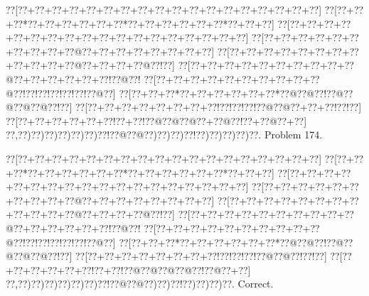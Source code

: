 \documentclass[a5paper]{article}
\begin{document}
\begin{center}
{\goo
\0??[\0??+\0??+\0??+\0??+\0??+\0??+\0??+\0??+\0??+\0??+\0??+\0??+\0??+\0??+\0??+\0??+\0??+\0??]
\0??[\0??+\0??+\0??*\0??+\0??+\0??+\0??+\0??+\0??*\0??+\0??+\0??+\0??+\0??+\0??*\0??+\0??+\0??]
\0??[\0??+\0??+\0??+\0??+\0??+\0??+\0??+\0??+\0??+\0??+\0??+\0??+\0??+\0??+\0??+\0??+\0??+\0??]
\0??[\0??+\0??+\0??+\0??+\0??+\0??+\0??+\0??+\0??+\0??@\0??+\0??+\0??+\0??+\0??+\0??+\0??+\0??]
\0??[\0??+\0??+\0??+\0??+\0??+\0??+\0??+\0??+\0??+\0??+\0??+\0??@\0??+\0??+\0??+\0??@\0??!\0??]
\0??[\0??+\0??+\0??+\0??+\0??+\0??+\0??+\0??+\0??+\0??@\0??+\0??+\0??+\0??+\0??+\0??!\0??@\0??!
\0??[\0??+\0??+\0??+\0??+\0??+\0??+\0??+\0??+\0??+\0??@\0??!\0??!\0??!\0??!\0??!\0??!\0??@\0??]
\0??[\0??+\0??+\0??*\0??+\0??+\0??+\0??+\0??+\0??*\0??@\0??@\0??!\0??@\0??@\0??@\0??@\0??!\0??]
\0??[\0??+\0??+\0??+\0??+\0??+\0??+\0??+\0??!\0??!\0??!\0??!\0??@\0??@\0??+\0??+\0??!\0??!\0??]
\0??[\0??+\0??+\0??+\0??+\0??+\0??!\0??+\0??!\0??@\0??@\0??@\0??+\0??@\0??!\0??+\0??@\0??+\0??]
\0??,\0??)\0??)\0??)\0??)\0??)\0??)\0??!\0??@\0??@\0??)\0??)\0??)\0??!\0??)\0??)\0??)\0??)\0??.
}
Problem 174.

\end{center}
\begin{center}
{\goo
\0??[\0??+\0??+\0??+\0??+\0??+\0??+\0??+\0??+\0??+\0??+\0??+\0??+\0??+\0??+\0??+\0??+\0??+\0??]
\0??[\0??+\0??+\0??*\0??+\0??+\0??+\0??+\0??+\0??*\0??+\0??+\0??+\0??+\0??+\0??*\0??+\0??+\0??]
\0??[\0??+\0??+\0??+\0??+\0??+\0??+\0??+\0??+\0??+\0??+\0??+\0??+\0??+\0??+\0??+\0??+\0??+\0??]
\0??[\0??+\0??+\0??+\0??+\0??+\0??+\0??+\0??+\0??+\0??@\0??+\0??+\0??+\0??+\0??+\0??+\0??+\0??]
\0??[\0??+\0??+\0??+\0??+\0??+\0??+\0??+\0??+\0??+\0??+\0??+\0??@\0??+\0??+\0??+\0??@\0??!\0??]
\0??[\0??+\0??+\0??+\0??+\0??+\0??+\0??+\0??+\0??+\0??@\0??+\0??+\0??+\0??+\0??+\0??!\0??@\0??!
\0??[\0??+\0??+\0??+\0??+\0??+\0??+\0??+\0??+\0??+\0??@\0??!\0??!\0??!\0??!\0??!\0??!\0??@\0??]
\0??[\0??+\0??+\0??*\0??+\0??+\0??+\0??+\0??+\0??*\0??@\0??@\0??!\0??@\0??@\0??@\0??@\0??!\0??]
\0??[\0??+\0??+\0??+\0??+\0??+\0??+\0??+\0??!\0??!\0??!\0??!\0??@\0??@\0??!\0??!\0??]
\0??[\0??+\0??+\0??+\0??+\0??+\0??!\0??+\0??!\0??@\0??@\0??@\0??@\0??!\0??@\0??+\0??]
\0??,\0??)\0??)\0??)\0??)\0??)\0??)\0??!\0??@\0??@\0??)\0??)\0??!\0??)\0??)\0??)\0??.
}
Correct. 

\end{center}
\end{document}
